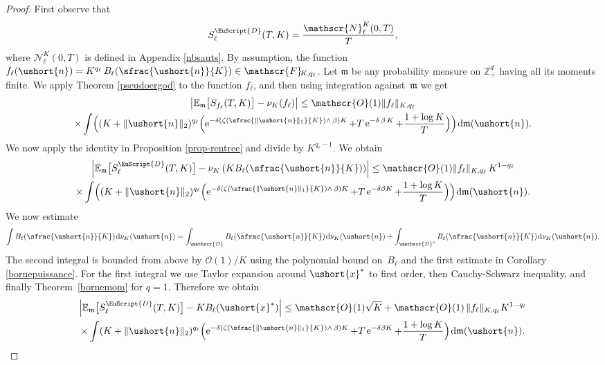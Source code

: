 \documentclass[10pt]{amsart}
\newcommand{\Psfrac}[2]{(\sfrac{#1}{#2})}
\let\mathcal\mathscr
\numberwithin{equation}{section}
\theoremstyle{plain}
\theoremstyle{definition}
\newcommand{\E}{{\mathbb{E}}}
\newcommand{\zentiers}{{\mathbb{Z}}}
\newcommand{\domaine}{\zentiers_{+}^{d}}
\newcommand{\Oun}{\mathcal{O}(1)}
\newcommand{\sK}{K}
\newcommand{\vecn}{\ushort{n}}
\newcommand{\vecxf}{\ushort{x}^*}
\newcommand{\nuk}{\nu_{K}}\let\snuk\nuk
\newcommand{\e}{\operatorname{e}}
\newcommand{\dd}{\hspace{1pt}\mathrm{d}}
\newcommand{\normdeux}[1]{\|#1\|_{2}}\let\snormdeux\normdeux
\begin{document}
\begin{proof}
First observe that
\[
S^{{ \EuScript{D}}}_{\ell}(T,K)=\frac{\mathcal{N}^{\sK}_\ell(0,T)}{T},
\]
where $\mathcal{N}^{\sK}_\ell(0,T)$ is defined in Appendix \ref{nbsauts}.
By assumption, the function $f_\ell(\vecn)=K^{q_\ell}\, B_\ell(\sfrac{\vecn}{K}) \in \mathscr{F}\!_{\sK,q_\ell}$.
Let $\mathfrak{m}$ be any probability measure on $\domaine$ having all its moments finite. We apply Theorem \ref{pseudoergod} to the function $f_\ell$, and then using integration against~$\mathfrak{m}$ we get
\begin{multline*}
\left| \E_{\mathfrak{m}}\bigl[S_{f_\ell}(T,K)\bigr] - \nuk(f_\ell)\right|
\leq \Oun \|f_\ell\|_{\sK,q_\ell}\\
\times\int \Bigl((K+\normdeux{\vecn})^{q_\ell}
\Bigl(\e^{-\delta\left(\zeta\Psfrac{\|\vecn\|_{1}}{K}\wedge\,\beta\right) K}
+T\e^{-\delta\,\beta\,K}+\frac{1+\log K}{T}\Bigr)\Bigr) \dd \mathfrak{m}(\vecn).
\end{multline*}
We now apply the identity in Proposition \ref{prop-rentree} and divide by $K^{q_\ell -1}$. We obtain
\begin{multline}
\label{boborne}
\left| \E_{\mathfrak{m}}\bigl[S^{{\EuScript{D}}}_{\ell}(T,K)\bigr] - \nuk\left(K B_\ell(\sfrac{\vecn}{K})\right) \right|
\leq \Oun\|f_\ell\|_{\sK,q_\ell}\, K^{1-q_\ell}\\
\times \int \Bigl((K+\normdeux{\vecn})^{q_\ell} \Bigl(\e^{-\delta\left(\zeta\Psfrac{\|\vecn\|_{1}}{K}\wedge\,\beta\right)K}+T\e^{-\delta \beta K}+\frac{1+\log K}{T}\Bigr)\Bigr) \dd\mathfrak{m}(\vecn).
\end{multline}
We now estimate
\[
\int B_\ell(\sfrac{\vecn}{K})\dd \nuk(\vecn)= \int_{\mathcal{D}} B_\ell(\sfrac{\vecn}{K}) \dd \nuk(\vecn)+
\int_{\mathcal{D}^c} B_\ell(\sfrac{\vecn}{K}) \dd \nuk(\vecn).
\]
The second integral is bounded from above by $\Oun/K$ using the polynomial bound on~$B_\ell$ and the first estimate in Corollary \ref{bornepuissance}.
For the first integral we use Taylor expansion around $\vecxf$ to first order, then Cauchy-Schwarz inequality, and finally Theorem~\ref{bornemom} for $q=1$. Therefore we obtain
\begin{multline}
\label{pasbeau}
\left|
\E_{\mathfrak{m}}\bigl[S^{{ \EuScript{D}}}_{\ell}(T,K)\bigr] - K B_\ell(\vecxf)\right|
\leq
\Oun \sqrt{K} +\Oun\, \|f_\ell\|_{\sK,q_\ell} K^{1-q_\ell}\\
\times \int (K+\normdeux{\vecn})^{q_\ell} \Bigl(\e^{-\delta\left(\zeta\Psfrac{\|\vecn\|_{1}}{K}\wedge\,\beta\right)K}
+T\e^{-\delta\beta K}+\frac{1+\log K}{T}\Bigr) \dd\mathfrak{m}(\vecn).

\end{multline}
\end{proof}
\end{document}
